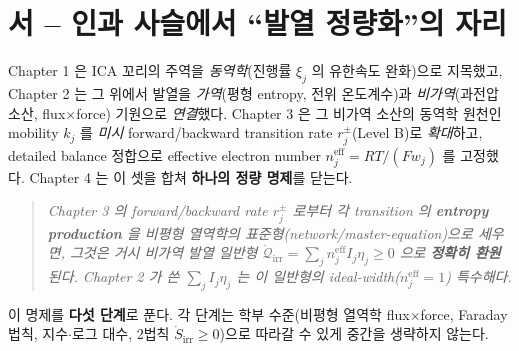 \documentclass[11pt,a4paper]{article}
\newcommand{\eff}{\mathrm{eff}}
\newcommand{\irr}{\mathrm{irr}}
\begin{document}
\section*{서 -- 인과 사슬에서 ``발열 정량화''의 자리}
Chapter 1 은 ICA 꼬리의 주역을 \emph{동역학}(진행률 $\xi_j$ 의 유한속도 완화)으로 지목했고, Chapter 2 는 그
위에서 발열을 \emph{가역}(평형 entropy, 전위 온도계수)과 \emph{비가역}(과전압 소산, flux$\times$force) 기원으로
\emph{연결}했다. Chapter 3 은 그 비가역 소산의 동역학 원천인 mobility $k_j$ 를 \emph{미시} forward/backward
transition rate $r_j^\pm$(Level B)로 \emph{확대}하고, detailed balance 정합으로 effective electron number
$n_j^{\eff}=RT/(Fw_j)$ 를 고정했다. Chapter 4 는 이 셋을 합쳐 \textbf{하나의 정량 명제}를 닫는다.
\begin{quote}\itshape
Chapter 3 의 forward/backward rate $r_j^\pm$ 로부터 각 transition 의 \textbf{entropy production} 을 비평형
열역학의 표준형(network/master-equation)으로 세우면, 그것은 거시 비가역 발열 \emph{일반형}
$\dot{\mathcal Q}_\irr=\sum_j n_j^{\eff}I_j\eta_j\ge0$ 으로 \textbf{정확히 환원}된다. Chapter 2 가 쓴
$\sum_j I_j\eta_j$ 는 이 일반형의 ideal-width($n_j^{\eff}=1$) 특수해다.
\end{quote}
이 명제를 \textbf{다섯 단계}로 푼다. 각 단계는 학부 수준(비평형 열역학 flux$\times$force, Faraday 법칙,
지수$\cdot$로그 대수, 2법칙 $\dot S_\irr\ge0$)으로 따라갈 수 있게 중간을 생략하지 않는다.
\end{document}
